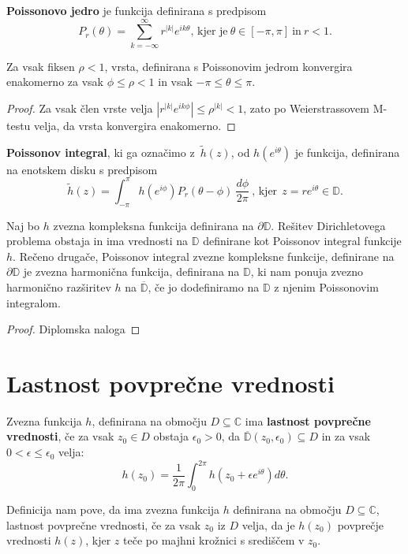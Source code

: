 \documentclass[mat1]{fmfdelo}
\newcommand{\C}{\mathbb C}
\begin{document}
    \begin{definicija}
        \textbf{Poissonovo jedro} je funkcija definirana s predpisom
        $$
           P_r(\theta) = \sum_{k = -\infty}^{\infty}{r^{|k|} e^{i k \theta}}\text{, kjer je}~\theta \in [-\pi, \pi]~\text{in}~ r < 1.
        $$
    \end{definicija}
    \begin{trditev}
        Za vsak fiksen $\rho < 1$, vrsta, definirana s Poissonovim jedrom konvergira enakomerno za vsak $\phi \leq \rho < 1$ in vsak $ -\pi \leq \theta \leq \pi$.
    \end{trditev}
    \begin{proof}
        Za vsak člen vrste velja $|r^{|k|} e^{i k \phi}| \leq \rho^{|k|} < 1$, zato po Weierstrassovem M-testu velja, da vrsta konvergira enakomerno.
    \end{proof}

    \begin{definicija}
        \textbf{Poissonov integral}, ki ga označimo z~$\widetilde{h}(z)$, od $h(e^{i\theta})$ je funkcija, definirana na enotskem disku s predpisom
        $$
        \widetilde{h}(z) = \int_{-\pi}^{\pi}{h(e^{i\phi}) P_r(\theta - \phi)~\frac{d\phi}{2 \pi}}~\text{, kjer}~~z = r e^{i\theta} \in \mathbb{D}.
        $$
     \end{definicija}
     \begin{trditev}
        Naj bo $h$ zvezna kompleksna funkcija definirana na $\partial \mathbb{D}$. Rešitev Dirichletovega problema obstaja in ima vrednosti na $\mathbb{D}$ definirane kot Poissonov integral funkcije $h$.
        \newline
        Rečeno drugače, Poissonov integral zvezne kompleksne funkcije, definirane na $\partial \mathbb{D}$ je zvezna harmonična funkcija, definirana na $\mathbb{D}$, ki nam ponuja zvezno harmonično razširitev $h$ na $\overline{\mathbb{D}}$, če jo dodefiniramo na $\mathbb{D}$ z njenim Poissonovim integralom.
     \end{trditev}
     \begin{proof}
        Diplomska naloga
     \end{proof}

\section{Lastnost povprečne vrednosti}
     \begin{definicija}
        Zvezna funkcija $h$, definirana na območju $D \subseteq \C$ ima \textbf{lastnost povprečne vrednosti}, če za vsak $z_0 \in D$ obstaja $\epsilon_0 > 0$, da $\overline{\mathbb{D}}(z_0, \epsilon_0) \subseteq D$ in za vsak $0 < \epsilon \leq \epsilon_0 $ velja:
        $$
            h(z_0) = \frac{1}{2 \pi} \int_{0}^{2 \pi}{h(z_0 + \epsilon e^{i \theta}) d\theta}.
        $$
    \end{definicija}
    \begin{opomba}
        Definicija nam pove, da ima zvezna funkcija $h$ definirana na območju $D \subseteq \C$, lastnost povprečne vrednosti, če za vsak $z_0$ iz $D$ velja, 
        da je $h(z_0)$ povprečje vrednosti $h(z)$, kjer $z$ teče po majhni krožnici s središčem v $z_0$.
    \end{opomba}
\end{document}
